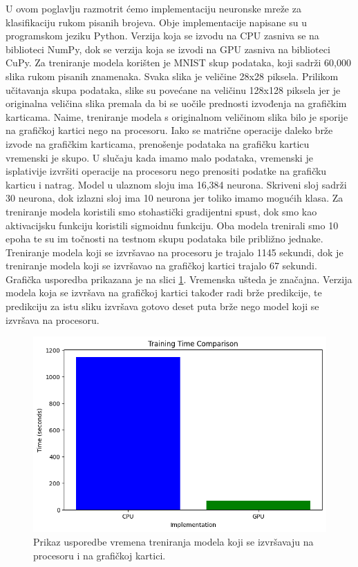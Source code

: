 \documentclass[a4paper,twocolumn]{article}
\begin{document}
	U ovom poglavlju razmotrit ćemo implementaciju neuronske mreže za klasifikaciju rukom pisanih brojeva. \cite{neural_networks} Obje implementacije napisane su u programskom jeziku Python. Verzija koja se izvodu na CPU zasniva se na biblioteci NumPy, dok se verzija koja se izvodi na GPU zasniva na biblioteci CuPy. \newline
	Za treniranje modela korišten je MNIST skup podataka, koji sadrži 60,000 slika rukom pisanih znamenaka. Svaka slika je veličine 28x28 piksela. Prilikom učitavanja skupa podataka, slike su povećane na veličinu 128x128 piksela jer je originalna veličina slika premala da bi se uočile prednosti izvođenja na grafičkim karticama. Naime, treniranje modela s originalnom veličinom slika bilo je sporije na grafičkoj kartici nego na procesoru. Iako se matrične operacije daleko brže izvode na grafičkim karticama, prenošenje podataka na grafičku karticu vremenski je skupo. U slučaju kada imamo malo podataka, vremenski je isplativije izvršiti operacije na procesoru nego prenositi podatke na grafičku karticu i natrag. \newline
	Model u ulaznom sloju ima 16,384 neurona. Skriveni sloj sadrži 30 neurona, dok izlazni sloj ima 10 neurona jer toliko imamo mogućih klasa. Za treniranje modela koristili smo stohastički gradijentni spust, dok smo kao aktivacijsku funkciju koristili sigmoidnu funkciju.
	Oba modela trenirali smo 10 epoha te su im točnosti na testnom skupu podataka bile približno jednake. Treniranje modela koji se izvršavao na procesoru je trajalo 1145 sekundi, dok je treniranje modela koji se izvršavao na grafičkoj kartici trajalo 67 sekundi. Grafička usporedba prikazana je na slici \ref{fig:cnn_training_time_comparison}. \newline
	Vremenska ušteda je značajna. Verzija modela koja se izvršava na grafičkoj kartici također radi brže predikcije, te predikciju za istu sliku izvršava gotovo deset puta brže nego model koji se izvršava na procesoru.
	
	\begin{figure}[H]
		\centering
		\includegraphics[width=1\linewidth]{slike/cnn_training_time_comparison.png} 
		\caption{Prikaz usporedbe vremena treniranja modela koji se izvršavaju na procesoru i na grafičkoj kartici.}
		\label{fig:cnn_training_time_comparison}
	\end{figure} 
\end{document}
